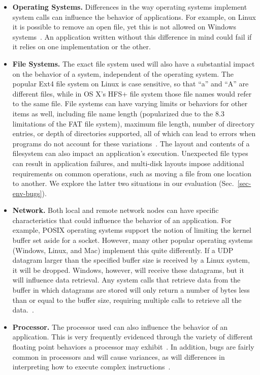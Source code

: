 \begin{itemize}

\item {\bf Operating Systems.} Differences in the way operating systems
implement system calls can influence the behavior of applications.  For
example, on Linux it is possible to remove an open file, yet this is not
allowed on Windows systems~\cite{UnlinkStandard}.  An application
written without this difference in mind could fail if it relies on one
implementation or the other.

\item {\bf File Systems.}  The exact file system used will also have a
substantial impact on the behavior of a system, independent of the
operating system.  The popular Ext4 file system on Linux is case sensitive,
so that ``a'' and ``A'' are different files,
while in OS X's HFS+ file system
those file names would refer to the same file.
File systems can have varying limits or behaviors for other items as well,
including file name length (popularized due to the 8.3 limitations of the
FAT file system), maximum file length, number of directory entries, or
depth
of directories supported, all of which can lead to errors when programs
do not account for these variations~\cite{EXT4Layout, AppleHFS}.
The layout and contents of a filesystem can also impact an application's
execution.  Unexpected file types can result in application
failures, and multi-disk layouts impose additional requirements on
common operations, such as moving a file from one location to
another.
        We explore the latter two situations in our
        evaluation (Sec.~\ref{sec-env-bugs}).

\item {\bf Network.} Both local and remote network nodes
can have specific characteristics that could influence the behavior of an
application.
For example, POSIX operating
systems support the notion of limiting the kernel buffer set aside for a
socket.  However, many other popular operating
systems (Windows, Linux, and Mac)
implement this quite differently.
If a UDP datagram
larger than the specified buffer size is received by a Linux system,
it will be dropped.
Windows,
however,
will receive these datagrams,
but it will influence data retrieval.
Any system calls that retrieve data from the buffer in which
datagrams are
stored will only return a number of bytes less than or equal to the
buffer size, requiring multiple calls
to retrieve all the data.~\cite{Zhuang_NSDI_2014}.

\item {\bf Processor.}  The processor used can also influence the
behavior of an application.  This is very frequently
evidenced through the variety of different floating point behaviors a
processor may exhibit~\cite{ArbitraryPrecision}.
In addition, bugs are fairly common
in processors and will cause variances, as will
differences in interpreting
how to execute complex instructions~\cite{Microarch}.

\end{itemize}

